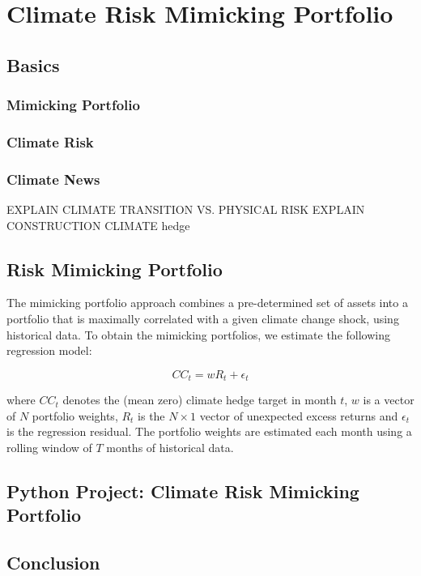 \chapter{Climate Risk Mimicking Portfolio}


\section{Basics}

\subsection{Mimicking Portfolio}

\subsection{Climate Risk}

\subsection{Climate News}

EXPLAIN CLIMATE TRANSITION VS. PHYSICAL RISK
EXPLAIN CONSTRUCTION CLIMATE hedge

\section{Risk Mimicking Portfolio}

The mimicking portfolio approach combines a pre-determined set of 
assets into a portfolio that is maximally correlated with a given 
climate change shock, using historical data. To obtain the mimicking
portfolios, we estimate the following regression model:

\begin{equation}
    \label{eq:regression}
    CC_t = w R_t + \epsilon_t
\end{equation}

where $CC_t$ denotes the (mean zero) climate hedge target in month $t$,
$w$ is a vector of $N$ portfolio weights, $R_t$ is the $N \times 1$ vector 
of unexpected excess returns and $\epsilon_t$ is the regression residual.
The portfolio weights are estimated each month using a rolling window of
$T$ months of historical data. 

\section{Python Project: Climate Risk Mimicking Portfolio}

\section{Conclusion}